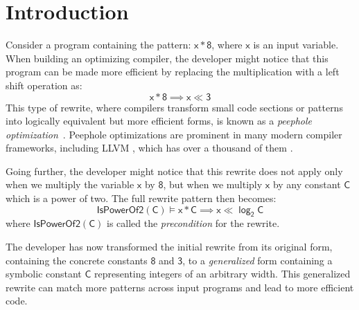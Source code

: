 \documentclass[review, anonymous, acmsmall]{acmart}
\newcommand{\blockmath}[1]{\[\mathsf{#1}\]}
\newcommand{\inline}[1]{$\mathsf{#1}$}
\begin{document}

\fi

\maketitle

\section{Introduction}
Consider a program containing the pattern: \inline{x * 8}, where \inline{x} is an input variable. When building an optimizing compiler, the developer might notice that this program can be made more efficient by replacing the multiplication with a left shift operation as:  
\[\mathsf{x * 8  \implies x \ll 3}\] 
This type of rewrite, where compilers transform small code sections or patterns into logically equivalent but more efficient forms, is known as a \textit{peephole optimization}~\cite{mckeemanPeephole1965}. Peephole optimizations are prominent in many modern compiler frameworks, including LLVM \cite{lattner_llvm_2004}, which has over a thousand of them \cite{menendez_termination-checking_2016}.  

Going further, the developer might notice that this rewrite does not apply only when we multiply the variable \inline{x} by \inline{8}, but when we multiply \inline{x} by any constant \inline{C} which is a power of two. The full rewrite pattern then becomes:
    \blockmath{IsPowerOf2(C) \models x * C \implies x \ll \log_2 C}
where $\mathsf{IsPowerOf2(C)}$ is called the \textit{precondition} for the rewrite. 

The developer has now transformed the initial rewrite from its original form, containing the concrete constants \inline{8} and \inline{3}, to a \textit{generalized} form containing a symbolic constant \inline{C} representing integers of an arbitrary width. This generalized rewrite can match more patterns across input programs and lead to more efficient code. 
\end{document}

